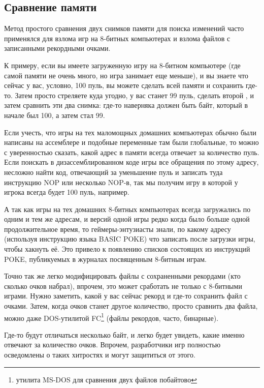 \subsection{Сравнение  памяти}
\label{snapshots_comparing}

Метод простого сравнения двух снимков памяти для поиска изменений часто применялся для взлома игр 
на 8-битных компьютерах и взлома файлов с записанными рекордными очками.

К примеру, если вы имеете загруженную игру на 8-битном компьютере (где самой памяти не очень много, но игра
занимает еще меньше), и вы знаете что сейчас у вас, условно, 100 пуль, вы можете сделать  всей
памяти и сохранить где-то. Затем просто стреляете куда угодно, у вас станет 99 пуль, сделать второй ,
и затем сравнить эти два снимка: где-то наверняка должен быть байт, который в начале был 100, а затем стал 99.

Если учесть, что игры на тех маломощных домашних компьютерах обычно были написаны на ассемблере и подобные
переменные там были глобальные, то можно с уверенностью сказать, какой адрес в памяти всегда отвечает за количество
пуль. Если поискать в дизассемблированном коде игры все обращения по этому адресу, несложно найти код,
отвечающий за уменьшение пуль и записать туда инструкцию \gls{NOP}
или несколько \gls{NOP}-в, так мы получим игру в которой у игрока всегда будет 100 пуль, например.

А так как игры на тех домашних 8-битных 
компьютерах всегда загружались по одним и тем же адресам, и версий одной игры редко когда было больше одной продолжительное время,
то геймеры-энтузиасты знали, по какому адресу (используя инструкцию языка BASIC \gls{POKE}) что записать после загрузки
игры, чтобы хакнуть её. Это привело к появлению списков  состоящих из инструкций \gls{POKE}, публикуемых
в журналах посвященным 8-битным играм.

Точно так же легко модифицировать файлы с сохраненными рекордами (кто сколько очков набрал), впрочем, это может
сработать не только с 8-битными играми. Нужно заметить, какой у вас сейчас рекорд и где-то сохранить файл
с очками. Затем, когда очков станет другое количество, просто сравнить два файла, можно даже
DOS-утилитой FC\footnote{утилита MS-DOS для сравнения двух файлов побайтово} (файлы рекордов, часто, бинарные).

Где-то будут отличаться несколько байт, и легко будет увидеть, какие именно отвечают за количество очков. 
Впрочем, разработчики игр полностью осведомлены о таких хитростях и могут защититься от этого.

